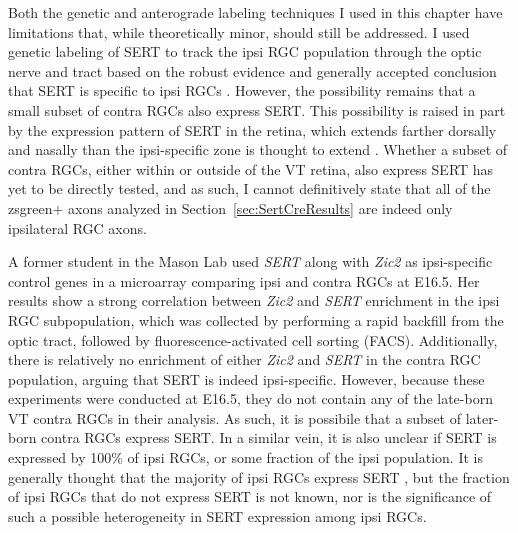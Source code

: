 \label{sec:TechnicalSERT}
Both the genetic and anterograde labeling techniques I used in this chapter have limitations that, while theoretically minor, should still be addressed.
I used genetic labeling of SERT to track the ipsi RGC population through the optic nerve and tract based on the robust evidence and generally accepted conclusion that SERT is specific to ipsi RGCs \cite{garcia2010zic2,koch2011pathway,upton1999excess}.
However, the possibility remains that a small subset of contra RGCs also express SERT.
This possibility is raised in part by the expression pattern of SERT in the retina, which extends farther dorsally and nasally than the ipsi-specific zone is thought to extend \cite{upton1999excess}.
Whether a subset of contra RGCs, either within or outside of the VT retina, also express SERT has yet to be directly tested, and as such, I cannot definitively state that all of the zsgreen+ axons analyzed in Section~\ref{sec:SertCreResults} are indeed only ipsilateral RGC axons.

A former student in the Mason Lab used \emph{SERT} along with \emph{Zic2} as ipsi-specific control genes in a microarray comparing ipsi and contra RGCs at E16.5. %
Her results show a strong correlation between \emph{Zic2} and \emph{SERT} enrichment in the ipsi RGC subpopulation, which was collected by performing a rapid backfill from the optic tract, followed by fluorescence-activated cell sorting (FACS). %
Additionally, there is relatively no enrichment of either \emph{Zic2} and \emph{SERT} in the contra RGC population, arguing that SERT is indeed ipsi-specific.
However, because these experiments were conducted at E16.5, they do not contain any of the late-born VT contra RGCs in their analysis.
As such, it is possibile that a subset of later-born contra RGCs express SERT.
In a similar vein, it is also unclear if SERT is expressed by 100\% of ipsi RGCs, or some fraction of the ipsi population.
It is generally thought that the majority of ipsi RGCs express SERT \cite{garcia2010zic2,koch2011pathway}, but the fraction of ipsi RGCs that do not express SERT is not known, nor is the significance of such a possible heterogeneity in SERT expression among ipsi RGCs.

